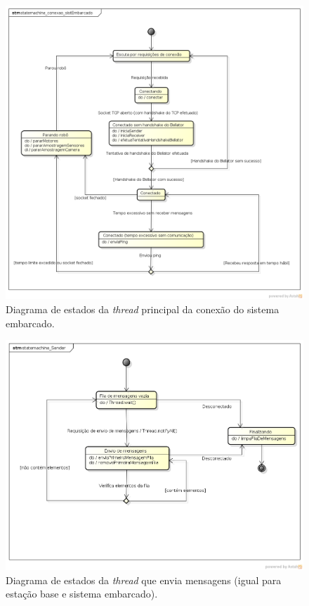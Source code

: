 \begin{figure}[H]
  \centering
  \includegraphics[width=\textwidth, keepaspectratio]{./figuras/sistEmbarcado/statemachine_conexao_sistEmbarcado.png}
  \caption{Diagrama de estados da \textit{thread} principal da conexão do sistema embarcado.}
  \label{fig:diagrama_estados_sist_embarcado}
\end{figure}

\begin{figure}[H]
  \centering
  \includegraphics[width=\textwidth, keepaspectratio]{./figuras/statemachine_Sender.png}
  \caption{Diagrama de estados da \textit{thread} que envia mensagens (igual para estação base e sistema embarcado).}
  \label{fig:diagrama_estados_sender}
\end{figure}

